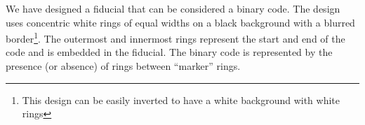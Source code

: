 \documentclass[runningheads]{llncs}
\begin{document}

We have designed a fiducial that can be considered a binary code.  The design
uses concentric white rings of equal widths on a black background with a
blurred border\footnote{This design can be easily inverted to have a white
background with white rings}. The outermost and innermost rings represent the
start and end of the code and is embedded in the fiducial.  The binary code is
represented by the presence (or absence) of rings between ``marker'' rings.
\end{document}
